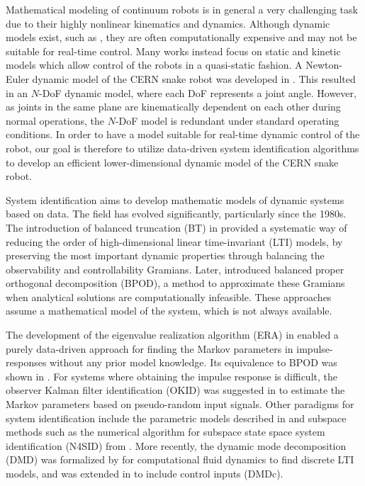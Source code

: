 \documentclass[../main.tex]{subfiles}
\begin{document}
Mathematical modeling of continuum robots is in general a very challenging task due to their highly nonlinear kinematics and dynamics. Although dynamic models exist, such as \cite{rucker2011a}, they are often computationally expensive and may not be suitable for real-time control. Many works instead focus on static and kinetic models \cite{rao2021} which allow control of the robots in a quasi-static fashion. A Newton-Euler dynamic model of the CERN snake robot was developed in \cite{dantuono2023, dantuono2024}. This resulted in an $N$-DoF dynamic model, where each DoF represents a joint angle. However, as joints in the same plane are kinematically dependent on each other during normal operations, the $N$-DoF model is redundant under standard operating conditions. In order to have a model suitable for real-time dynamic control of the robot, our goal is therefore to utilize data-driven system identification algorithms to develop an efficient lower-dimensional dynamic model of the CERN snake robot.

System identification aims to develop mathematic models of dynamic systems based on data. The field has evolved significantly, particularly since the 1980s. The introduction of balanced truncation (BT) in \cite{moore1981} provided a systematic way of reducing the order of high-dimensional linear time-invariant (LTI) models, by preserving the most important dynamic properties through balancing the observability and controllability Gramians. Later, \cite{rowley2005} introduced balanced proper orthogonal decomposition (BPOD), a method to approximate these Gramians when analytical solutions are computationally infeasible. These approaches assume a mathematical model of the system, which is not always available.


The development of the eigenvalue realization algorithm (ERA) in \cite{juang1985} enabled a purely data-driven approach for finding the Markov parameters in impulse-responses without any prior model knowledge. Its equivalence to BPOD was shown in \cite{ma2011}. For systems where obtaining the impulse response is difficult, the observer Kalman filter identification (OKID) was suggested in \cite{juang1991} to estimate the Markov parameters based on pseudo-random input signals. Other paradigms for system identification include the parametric models described in \cite{ljung1999} and subspace methods such as the numerical algorithm for subspace state space system identification (N4SID) from \cite{vanoverschee1994}. More recently, the dynamic mode decomposition (DMD) was formalized by \cite{schmid2010} for computational fluid dynamics to find discrete LTI models, and was extended in \cite{proctor2016} to include control inputs (DMDc).
\end{document}
